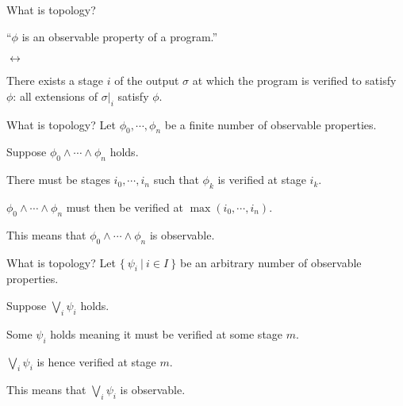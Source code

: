 \documentclass[xcolor={dvipsnames}]{beamer}
\begin{document}
\begin{frame}{What is topology?}
  \large
  \begin{center}
    ``$\phi$ is an \alert{observable property} of a program.''

    \vspace{0.5em}
    $\leftrightarrow$
    \vspace{0.5em}

    There exists a stage $i$ of the output $\sigma$ at which the program is \alert{verified} to
    satisfy $\phi$: all extensions of $\sigma|_i$ satisfy $\phi$.
  \end{center}
\end{frame}

\begin{frame}{What is topology?}
  Let $\phi_0, \cdots ,\phi_n$ be a \alert{finite} number of observable properties.

  \vspace{1em}

  Suppose $\phi_0 \wedge \cdots \wedge \phi_n$ holds.

  \vspace{1em}

  There must be \alert{stages} $i_0, \cdots , i_n$ such that $\phi_k$ is verified at stage $i_k$.

  \vspace{1em}

  $\phi_0 \wedge \cdots \wedge \phi_n$ must then be verified at $\max(i_0, \cdots, i_n)$.

  \vspace{1em}

  This means that $\phi_0 \wedge \cdots \wedge \phi_n$ is \alert{observable}.
\end{frame}

\begin{frame}{What is topology?}
    Let $\{~\psi_i ~|~ i \in I~\}$ be an \alert{arbitrary} number of observable properties.

    \vspace{1em}

    Suppose $\bigvee_i \psi_i$ holds.

    \vspace{1em}

    Some $\psi_i$ holds meaning it must be verified at some stage $m$.

    \vspace{1em}

    $\bigvee_i \psi_i$ is hence verified at stage $m$.

    \vspace{1em}

    This means that $\bigvee_i \psi_i$ is \alert{observable}.
\end{frame}
\end{document}
